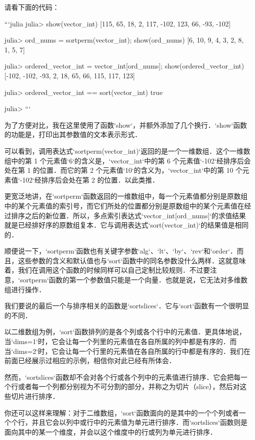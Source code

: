 请看下面的代码：

```julia
julia> show(vector_int)
[115, 65, 18, 2, 117, -102, 123, 66, -93, -102]

julia> ord_nums = sortperm(vector_int); show(ord_nums)
[6, 10, 9, 4, 3, 2, 8, 1, 5, 7]

julia> ordered_vector_int = vector_int[ord_nums]; show(ordered_vector_int)
[-102, -102, -93, 2, 18, 65, 66, 115, 117, 123]

julia> ordered_vector_int == sort(vector_int)
true

julia>
```

为了方便对比，我在这里使用了函数`show`，并额外添加了几个换行．`show`函数的功能是，打印出其参数值的文本表示形式．

可以看到，调用表达式`sortperm(vector_int)`返回的是一个一维数组．这个一维数组中的第 1 个元素值`6`的含义是，`vector_int`中的第 6 个元素值`-102`经排序后会处在第 1 的位置．而它的第 2 个元素值`10`的含义为，`vector_int`中的第 10 个元素值`-102`经排序后会处在第 2 的位置．以此类推．

更宽泛地讲，在`sortperm`函数返回的一维数组中，每一个元素值都分别是原数组中的某个元素值的索引号，而它们所处的位置都分别是原数组中的某个元素值在经过排序之后的新位置．所以，多点索引表达式`vector_int[ord_nums]`的求值结果就是已经排好序的原数组复本．它与调用表达式`sort(vector_int)`的结果值是相同的．

顺便说一下，`sortperm`函数也有关键字参数`alg`、`lt`、`by`、`rev`和`order`．而且，这些参数的含义和默认值也与`sort`函数中的同名参数没什么两样．这就意味着，我们在调用这个函数的时候同样可以自己定制比较规则．不过要注意，`sortperm`函数的第一个参数值只能是一个向量．也就是说，它无法对多维数组进行操作．

我们要说的最后一个与排序相关的函数是`sortslices`．它与`sort`函数有一个很明显的不同．

以二维数组为例，`sort`函数排列的是各个列或各个行中的元素值．更具体地说，当`dims=1`时，它会让每一个列里的元素值在各自所属的列中都是有序的．而当`dims=2`时，它会让每一个行里的元素值在各自所属的行中都是有序的．我们在前面已经展示过相应的示例，相信你对此已经有所体会．

然而，`sortslices`函数却不会对各个行或各个列中的元素值进行排序．它会把每一个行或者每一个列都分别视为不可分割的部分，并称之为切片（slice），然后对这些切片进行排序．

你还可以这样来理解：对于二维数组，`sort`函数面向的是其中的一个个列或者一个个行，并且它会以列中或行中的元素值为单元进行排序．而`sortslices`函数则是面向其中的某一个维度，并会以这个维度中的行或列为单元进行排序．

